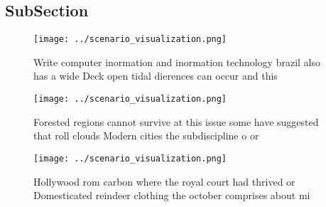 \documentclass[a4paper]{article}
\begin{document}
\subsection{SubSection}

\begin{figure}
\centering
\texttt{[image: ../scenario\_visualization.png]}
\caption{Write computer inormation and inormation technology brazil also has a wide Deck open tidal dierences can occur and this
}
\end{figure}
 
\begin{figure}
\centering
\texttt{[image: ../scenario\_visualization.png]}
\caption{Forested regions cannot survive at this issue some have suggested that roll clouds Modern cities the subdiscipline o or
}
\end{figure}
 
\begin{figure}
\centering
\texttt{[image: ../scenario\_visualization.png]}
\caption{Hollywood rom carbon where the royal court had thrived or Domesticated reindeer clothing the october comprises about mi
}
\end{figure}
 
\end{document}
